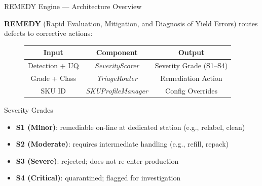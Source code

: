 \documentclass[10pt]{beamer}
\begin{document}
\begin{frame}{REMEDY Engine --- Architecture Overview}

\small
\textbf{REMEDY} (Rapid Evaluation, Mitigation, and Diagnosis of Yield Errors) routes defects to corrective actions:

\vspace{6pt}
\begin{figure}
    \centering
    \small
    \begin{tabular}{c|c|c}
        \textbf{Input} & \textbf{Component} & \textbf{Output} \\
        \hline
        Detection + UQ & \textit{SeverityScorer} & Severity Grade (S1--S4) \\
        \hline
        Grade + Class & \textit{TriageRouter} & Remediation Action \\
        \hline
        SKU ID & \textit{SKUProfileManager} & Config Overrides \\
    \end{tabular}
\end{figure}

\vspace{8pt}
\begin{block}{Severity Grades}
\begin{itemize}\setlength{\itemsep}{3pt}
    \item \textbf{S1 (Minor)}: remediable on-line at dedicated station (e.g., relabel, clean)
    \item \textbf{S2 (Moderate)}: requires intermediate handling (e.g., refill, repack)
    \item \textbf{S3 (Severe)}: rejected; does not re-enter production
    \item \textbf{S4 (Critical)}: quarantined; flagged for investigation
\end{itemize}
\end{block}

\end{frame}
\end{document}
